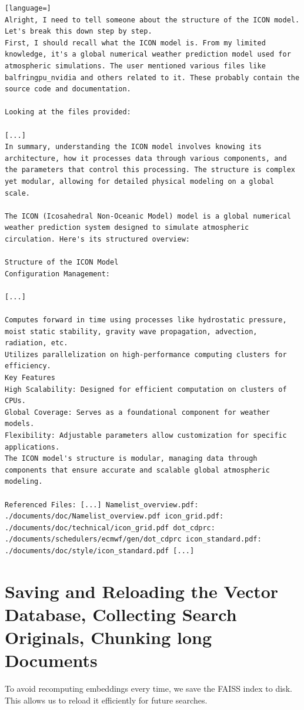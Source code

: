\begin{lstlisting}[language=]
Alright, I need to tell someone about the structure of the ICON model. Let's break this down step by step.
First, I should recall what the ICON model is. From my limited knowledge, it's a global numerical weather prediction model used for atmospheric simulations. The user mentioned various files like balfringpu_nvidia and others related to it. These probably contain the source code and documentation.

Looking at the files provided:

[...]
In summary, understanding the ICON model involves knowing its architecture, how it processes data through various components, and the parameters that control this processing. The structure is complex yet modular, allowing for detailed physical modeling on a global scale.

The ICON (Icosahedral Non-Oceanic Model) model is a global numerical weather prediction system designed to simulate atmospheric circulation. Here's its structured overview:

Structure of the ICON Model
Configuration Management:

[...]

Computes forward in time using processes like hydrostatic pressure, moist static stability, gravity wave propagation, advection, radiation, etc.
Utilizes parallelization on high-performance computing clusters for efficiency.
Key Features
High Scalability: Designed for efficient computation on clusters of CPUs.
Global Coverage: Serves as a foundational component for weather models.
Flexibility: Adjustable parameters allow customization for specific applications.
The ICON model's structure is modular, managing data through components that ensure accurate and scalable global atmospheric modeling.

Referenced Files: [...] Namelist_overview.pdf: ./documents/doc/Namelist_overview.pdf icon_grid.pdf: ./documents/doc/technical/icon_grid.pdf dot_cdprc: ./documents/schedulers/ecmwf/gen/dot_cdprc icon_standard.pdf: ./documents/doc/style/icon_standard.pdf [...]
\end{lstlisting}


%
\section{Saving and Reloading the Vector Database, Collecting Search Originals, Chunking long Documents}
To avoid recomputing embeddings every time, we save the FAISS index to disk. 
This allows us to reload it efficiently for future searches.

